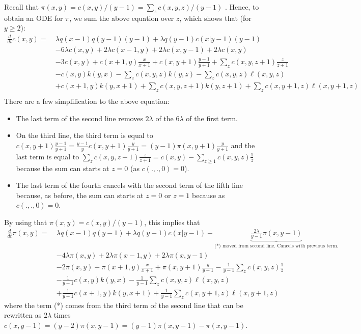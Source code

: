 \documentclass[acmsmall,nonacm]{acmart}
\begin{document}
Recall that $\pi(x,y)=c(x,y)/(y-1) = \sum_z c(x,y,z)/(y-1)$ . Hence, to obtain an ODE for $\pi$, we sum the above equation over $z$, which shows that (for $y\ge2$):
\begin{align*}
    \frac{d}{dt} c(x,y) = ~&\lambda q(x-1)q(y-1)(y-1) + \lambda q(y-1)c(x|y-1) (y-1) \nonumber\\
    & -6\lambda c(x,y) + 2\lambda c(x-1,y) + 2\lambda c(x,y-1) + 2\lambda c(x,y) \nonumber \\
    &-3 c(x,y) + c(x+1,y)\frac{x}{x+1}+  c(x,y+1)\frac{y-1}{y+1} + \sum_z c(x,y,z+1)\frac{z}{z+1} \nonumber\\
    &-c(x,y) k(y,x)  -\sum_z c(x,y,z) k(y,z) -\sum_z c(x,y,z) \ell(x,y,z) \nonumber \\
    &+c(x+1,y) k(y, x+1) + \sum_z c(x,y,z+1) k(y, z+1) + \sum_z c(x,y+1,z) \ell(x,y+1,z)\\
\end{align*}
There are a few simplification to the above equation: 
\begin{itemize}
    \item The last term of the second line removes $2\lambda$ of the $6\lambda$ of the first term.
    \item On the third line, the third term is equal to $c(x,y+1)\frac{y-1}{y+1}=\frac{y-1}{y}c(x,y+1)\frac{y}{y+1}=(y-1)\pi(x,y+1)\frac{y}{y+1}$ and the last term is equal to $\sum_z c(x,y,z+1)\frac{z}{z+1}=c(x,y) - \sum_{z\ge1}c(x,y,z)\frac{1}{z}$ because the sum can starts at $z=0$ (as $c(.,.,0)=0$). 
    \item The last term of the fourth cancels with the second term of the fifth line because, as before, the sum can starts at $z=0$ or $z=1$ because as  $c(.,.,0)=0$.
\end{itemize}

By using that $\pi(x,y)=c(x,y)/(y-1)$, this implies that
\begin{align}
    \label{eq:triplet_pi(x,y)}
    \frac{d}{dt} \pi(x,y) = ~&\lambda q(x-1)q(y-1) + \lambda q(y-1)c(x|y-1) - \underbrace{\frac{2\lambda}{y-1}\pi(x,y-1)}_{\text{(*) moved from second line. Cancels with previous term.}}\nonumber\\
    & -4\lambda \pi(x,y) + 2\lambda \pi(x-1,y) + 2\lambda \pi(x,y-1)  \nonumber \\
    &-2 \pi(x,y) + \pi(x+1,y)\frac{x}{x+1}+  \pi(x,y+1)\frac{y}{y+1} - \frac{1}{y-1} \sum_z c(x,y,z)\frac{1}{z} \nonumber\\
    &- \frac{1}{y-1} c(x,y) k(y,x)   - \frac{1}{y-1} \sum_z c(x,y,z) \ell(x,y,z) \nonumber \\
    &+\frac{1}{y-1} c(x+1,y) k(y, x+1) + \frac{1}{y-1} \sum_z c(x,y+1,z) \ell(x,y+1,z)
\end{align}
where the term (*) comes from the third term of the second line that can be rewritten as $2\lambda$ times $c(x,y-1)=(y-2)\pi(x,y-1)=(y-1)\pi(x,y-1)-\pi(x,y-1)$.
\end{document}
